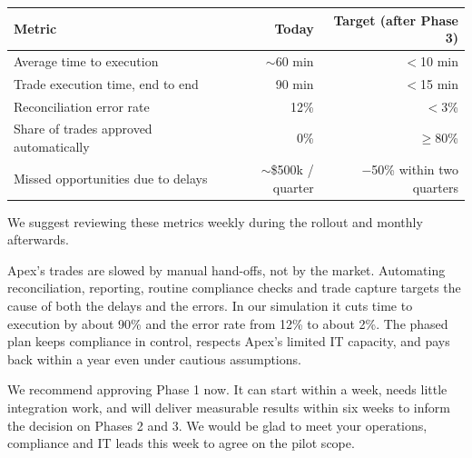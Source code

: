 \documentclass[11pt]{article}
\let\oldsubheading\subheading
\renewcommand{\subheading}[1]{\Needspace{6\baselineskip}\oldsubheading{#1}}
\let\oldheading\heading
\renewcommand{\heading}[1]{\Needspace{8\baselineskip}\oldheading{#1}}
\begin{document}
\begin{center}
\small
\begin{tabular}{@{}lrr@{}}
  \toprule
  \textbf{Metric} & \textbf{Today} & \textbf{Target (after Phase 3)} \\
  \midrule
  Average time to execution & $\sim$60 min & $<$10 min \\
  Trade execution time, end to end & 90 min & $<$15 min \\
  Reconciliation error rate & 12\% & $<$3\% \\
  Share of trades approved automatically & 0\% & $\geq$80\% \\
  Missed opportunities due to delays & $\sim$\$500k / quarter & $-$50\% within
    two quarters \\
  \bottomrule
\end{tabular}
\end{center}
We suggest reviewing these metrics weekly during the rollout and monthly
afterwards.


Apex's trades are slowed by manual hand-offs, not by the market. Automating
reconciliation, reporting, routine compliance checks and trade capture
targets the cause of both the delays and the errors. In our simulation it
cuts time to execution by about 90\% and the error rate from 12\% to about
2\%. The phased plan keeps compliance in control, respects Apex's limited IT
capacity, and pays back within a year even under cautious assumptions.

We recommend approving Phase 1 now. It can start within a week, needs little
integration work, and will deliver measurable results within six weeks to
inform the decision on Phases 2 and 3. We would be glad to meet your
operations, compliance and IT leads this week to agree on the pilot scope.
\end{document}
